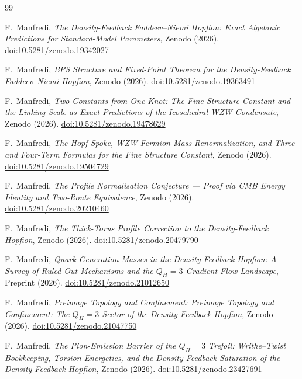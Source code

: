 \documentclass[11pt,a4paper]{article}
\theoremstyle{definition}\newtheorem{definition}[theorem]{Definition}
\theoremstyle{remark}
\begin{document}
\begin{thebibliography}{99}

F.~Manfredi,
\textit{The Density-Feedback Faddeev--Niemi Hopfion:
  Exact Algebraic Predictions for Standard-Model Parameters},
Zenodo (2026).
\href{https://doi.org/10.5281/zenodo.19342027}{doi:10.5281/zenodo.19342027}

F.~Manfredi,
\textit{BPS Structure and Fixed-Point Theorem for the
  Density-Feedback Faddeev--Niemi Hopfion},
Zenodo (2026).
\href{https://doi.org/10.5281/zenodo.19363491}{doi:10.5281/zenodo.19363491}

F.~Manfredi,
\textit{Two Constants from One Knot: The Fine Structure Constant and
  the Linking Scale as Exact Predictions of the Icosahedral WZW Condensate},
Zenodo (2026).
\href{https://doi.org/10.5281/zenodo.19478629}{doi:10.5281/zenodo.19478629}

F.~Manfredi,
\textit{The Hopf Spoke, WZW Fermion Mass Renormalization,
  and Three- and Four-Term Formulas for the Fine Structure Constant},
Zenodo (2026).
\href{https://doi.org/10.5281/zenodo.19504729}{doi:10.5281/zenodo.19504729}

F.~Manfredi,
\textit{The Profile Normalisation Conjecture ---
  Proof via CMB Energy Identity and Two-Route Equivalence},
Zenodo (2026).
\href{https://doi.org/10.5281/zenodo.20210460}{doi:10.5281/zenodo.20210460}

F.~Manfredi,
\textit{The Thick-Torus Profile Correction to the Density-Feedback Hopfion},
Zenodo (2026).
\href{https://doi.org/10.5281/zenodo.20479790}{doi:10.5281/zenodo.20479790}

F.~Manfredi,
\textit{Quark Generation Masses in the Density-Feedback Hopfion:
A Survey of Ruled-Out Mechanisms and the $Q_H=3$ Gradient-Flow Landscape},
Preprint (2026).
\href{https://doi.org/10.5281/zenodo.21012650}{doi:10.5281/zenodo.21012650}

 F.~Manfredi,
\textit{Preimage Topology and Confinement: Preimage Topology and Confinement: The $Q_H=3$ Sector of the Density-Feedback Hopfion},
Zenodo (2026).
\href{https://doi.org/10.5281/zenodo.21047750}{doi:10.5281/zenodo.21047750}

 F.~Manfredi,
\textit{The Pion-Emission Barrier of the $Q_H=3$ Trefoil: Writhe--Twist Bookkeeping,
Torsion Energetics, and the Density-Feedback Saturation of the Density-Feedback Hopfion},
Zenodo (2026).
\href{https://doi.org/10.5281/zenodo.23427691}{doi:10.5281/zenodo.23427691}


\end{thebibliography}
\end{document}
